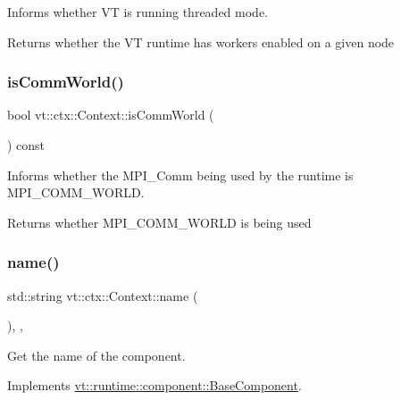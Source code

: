 Informs whether VT is running threaded mode. 

\begin{DoxyReturn}{Returns}
whether the VT runtime has workers enabled on a given node 
\end{DoxyReturn}
\mbox{\label{structvt_1_1ctx_1_1_context_a78d9926c3f75b1296e81607fd303f8f1}} 
\subsubsection{\texorpdfstring{is\+Comm\+World()}{isCommWorld()}}
{\footnotesize\ttfamily bool vt\+::ctx\+::\+Context\+::is\+Comm\+World (\begin{DoxyParamCaption}{ }\end{DoxyParamCaption}) const\hspace{0.3cm}{\ttfamily [inline]}}



Informs whether the M\+P\+I\+\_\+\+Comm being used by the runtime is {\ttfamily M\+P\+I\+\_\+\+C\+O\+M\+M\+\_\+\+W\+O\+R\+LD}. 

\begin{DoxyReturn}{Returns}
whether {\ttfamily M\+P\+I\+\_\+\+C\+O\+M\+M\+\_\+\+W\+O\+R\+LD} is being used 
\end{DoxyReturn}
\mbox{\label{structvt_1_1ctx_1_1_context_a6bef35c171d45feb409d7b6aa6168996}} 
\subsubsection{\texorpdfstring{name()}{name()}}
{\footnotesize\ttfamily std\+::string vt\+::ctx\+::\+Context\+::name (\begin{DoxyParamCaption}{ }\end{DoxyParamCaption})\hspace{0.3cm}{\ttfamily [inline]}, {\ttfamily [override]}, {\ttfamily [virtual]}}



Get the name of the component. 



Implements \hyperlink{structvt_1_1runtime_1_1component_1_1_base_component_a7701485f3539f78d42e6bad47fc7eb78}{vt\+::runtime\+::component\+::\+Base\+Component}.

